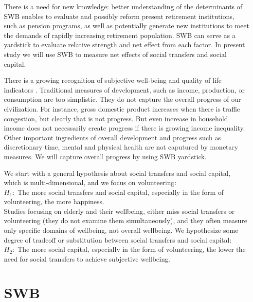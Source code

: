 \documentclass[10pt, letterpaper]{article}
\begin{document}
\begin{spacing}{1.4}
There is a need for new knowledge: better understanding of the determinants of
SWB enables to evaluate and possibly reform present retirement
institutions, such as pension programs, as well
as potentially generate new institutions to meet the demands of rapidly
increasing retirement population. SWB can serve as a yardstick to evaluate
relative strength and net effect from each factor. In present study we will use SWB
to measure net effects of social transfers and social capital.

There is a growing recognition of subjective  well-being and quality of life
indicators \citep{aok_lsPol16}. Traditional
measures of development, such as income, production, or consumption are too
simplistic. They do not capture the overall progress of our civilization. For
instance, gross domestic product increases when there is traffic congestion, but
clearly that is not 
progress. But even increase in household income does not necessarily
 create progress if there is growing income inequality. 
Other important ingredients of overall development and progress such as
discretionary time, mental and physical health are not caputured by monetary measures. We will
capture overall progress by using SWB yardstick.

%
 We start with a general hypothesis about social
 transfers and social capital, which is multi-dimensional, and we focus  on volunteering:\\
\noindent$H_1:$ The more social transfers and social capital, especially in the
form of volunteering, the more happiness.\\

Studies focusing on elderly and their wellbeing, either miss social
transfers or volunteering (they do not examine them simultaneously), and they
often measure only specific domains of wellbeing, not overall wellbeing. We
hypothesize some degree of tradeoff or substitution between social transfers and
social capital:\\ 

\noindent$H_2:$ The more social capital, especially in the form of volunteering,
the lower the need for social transfers to achieve subjective wellbeing.\\ 

\section{SWB} 


\end{spacing}
\end{document}
